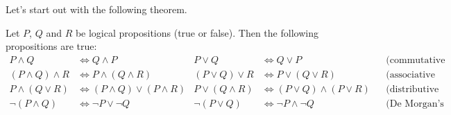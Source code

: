 \documentclass{tstextbook}
\begin{document}
Let's start out with the following theorem.

\begin{theorem}
  \label{th:logicalgebra}
  Let $P$, $Q$ and $R$ be logical propositions (true or false).
  Then the following propositions are true:
  \small
  \begin{align*}
    P \land Q &\Leftrightarrow Q \land P &
    P \lor  Q &\Leftrightarrow Q \lor P  &&
    \text{(commutative laws)} \\
    (P \land Q) \land R &\Leftrightarrow P \land (Q \land R) &
    (P \lor Q)  \lor  R &\Leftrightarrow P \lor  (Q \lor  R) &&
    \text{(associative laws)} \\
    P \land (Q \lor  R) &\Leftrightarrow (P \land Q) \lor  (P \land R) &
    P \lor  (Q \land R) &\Leftrightarrow (P \lor  Q) \land (P \lor  R) &&
    \text{(distributive laws)} \\
    \lnot (P \land Q) &\Leftrightarrow \lnot P \lor  \lnot Q &
    \lnot (P \lor  Q) &\Leftrightarrow \lnot P \land \lnot Q &&
    \text{(De Morgan's laws)}
  \end{align*}
\end{theorem}
\end{document}
